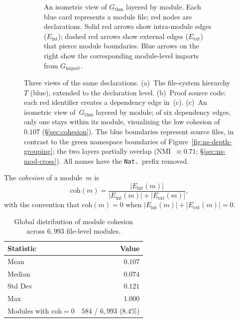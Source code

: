 \begin{figure}[H]
\begin{subfigure}[b]{\textwidth}
\begin{tikzpicture}
\end{tikzpicture}
\caption{An isometric view of $G_{\mathrm{thm}}$ layered by module. Each \textcolor{blue!60!black}{blue card} represents a module file; \textcolor{red!70!black}{red nodes} are declarations. Solid \textcolor{red!70!black}{red arrows} show intra-module edges ($E_{\mathrm{int}}$); dashed \textcolor{red!70!black}{red arrows} show external edges ($E_{\mathrm{ext}}$) that pierce module boundaries. \textcolor{blue!60!black}{Blue arrows} on the right show the corresponding module-level imports from $G_{\mathrm{import}}$.}
\label{fig:dep-view}
\end{subfigure}
\caption{Three views of the same declarations. (a)~The file-system hierarchy~$T$ (\textcolor{blue!60!black}{blue}), extended to the declaration level. (b)~Proof source code: each \textcolor{red!70!black}{red identifier} creates a dependency edge in~(c). (c)~An isometric view of~$G_{\mathrm{thm}}$ layered by module; of six dependency edges, only one stays within its module, visualizing the low cohesion of~$0.107$ (\S\ref{sec:cohesion}). The \textcolor{blue!60!black}{blue} boundaries represent source files, in contrast to the \textcolor{green!40!black}{green} namespace boundaries of Figure~\ref{fig:ns-depth-grouping}; the two layers partially overlap (NMI~$\approx 0.71$; \S\ref{sec:ns-mod-cross}). All names have the \texttt{Nat.}\ prefix removed.}
\label{fig:module-region}
\end{figure}

\begin{definition}
\label{def:cohesion}
The \emph{cohesion} of a module~$m$ is
\[
  \mathrm{coh}(m) = \frac{|E_{\mathrm{int}}(m)|}{|E_{\mathrm{int}}(m)| + |E_{\mathrm{ext}}(m)|},
\]
with the convention that $\mathrm{coh}(m) = 0$ when $|E_{\mathrm{int}}(m)| + |E_{\mathrm{ext}}(m)| = 0$.
\end{definition}

\begin{table}[ht]
\centering
\caption{Global distribution of module cohesion across $6{,}993$ file-level modules.}
\label{tab:cohesion-global}
\begin{tabular}{lr}
\toprule
Statistic & Value \\
\midrule
Mean       & $0.107$ \\
Median     & $0.074$ \\
Std Dev    & $0.121$ \\
Max        & $1.000$ \\
Modules with $\mathrm{coh} = 0$ & $584$ / $6{,}993$ ($8.4\%$) \\
\bottomrule
\end{tabular}
\end{table}

